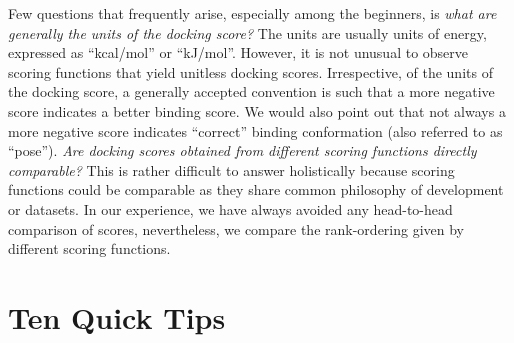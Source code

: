 \documentclass[10pt,letterpaper]{article}
\begin{document}
{{Few questions that frequently arise, especially among the beginners, is \textit{what are generally the units of the docking score?}  The units are usually units of energy, expressed as “kcal/mol” or “kJ/mol”. However, it is not unusual to observe scoring functions that yield unitless docking scores. Irrespective, of the units of the docking score, a generally accepted convention is such that a more negative score indicates a better binding score. We would also point out that not always a more negative score indicates “correct” binding conformation (also referred to as “pose”).  
\textit{Are docking scores obtained from different scoring functions directly comparable?} This is rather difficult to answer holistically because scoring functions could be comparable as they share common philosophy of development or datasets. In our experience, we have always avoided any head-to-head comparison of scores, nevertheless, we compare the rank-ordering given by different scoring functions\cite{bib27}.  


\section*{Ten Quick Tips}

}}
\end{document}
